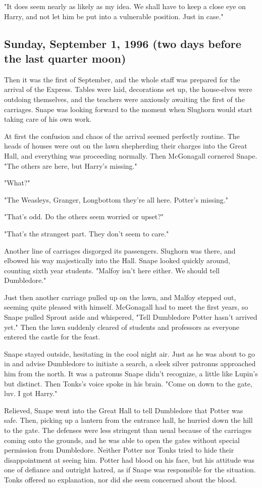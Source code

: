 "It does seem nearly as likely as my idea. We shall have to keep a close eye on Harry, and not let him be put into a vulnerable position. Just in case."

\subsection{Sunday, September 1, 1996 (two days before the last quarter moon)}

Then it was the first of September, and the whole staff was prepared for the arrival of the Express. Tables were laid, decorations set up, the house-elves were outdoing themselves, and the teachers were anxiously awaiting the first of the carriages. Snape was looking forward to the moment when Slughorn would start taking care of his own work.

At first the confusion and chaos of the arrival seemed perfectly routine. The heads of houses were out on the lawn shepherding their charges into the Great Hall, and everything was proceeding normally. Then McGonagall cornered Snape. "The others are here, but Harry's missing."

"What?"

"The Weasleys, Granger, Longbottom{\el} they're all here. Potter's missing."

"That's odd. Do the others seem worried or upset?"

"That's the strangest part. They don't seem to care."

Another line of carriages disgorged its passengers. Slughorn was there, and elbowed his way majestically into the Hall. Snape looked quickly around, counting sixth year students. "Malfoy isn't here either. We should tell Dumbledore."

Just then another carriage pulled up on the lawn, and Malfoy stepped out, seeming quite pleased with himself. McGonagall had to meet the first years, so Snape pulled Sprout aside and whispered, "Tell Dumbledore Potter hasn't arrived yet." Then the lawn suddenly cleared of students and professors as everyone entered the castle for the feast.

Snape stayed outside, hesitating in the cool night air. Just as he was about to go in and advise Dumbledore to initiate a search, a sleek silver patronus approached him from the north. It was a patronus Snape didn't recognize, a little like Lupin's but distinct. Then Tonks's voice spoke in his brain. "Come on down to the gate, luv. I got Harry."

Relieved, Snape went into the Great Hall to tell Dumbledore that Potter was safe. Then, picking up a lantern from the entrance hall, he hurried down the hill to the gate. The defenses were less stringent than usual because of the carriages coming onto the grounds, and he was able to open the gates without special permission from Dumbledore. Neither Potter nor Tonks tried to hide their disappointment at seeing him. Potter had blood on his face, but his attitude was one of defiance and outright hatred, as if Snape was responsible for the situation. Tonks offered no explanation, nor did she seem concerned about the blood.

